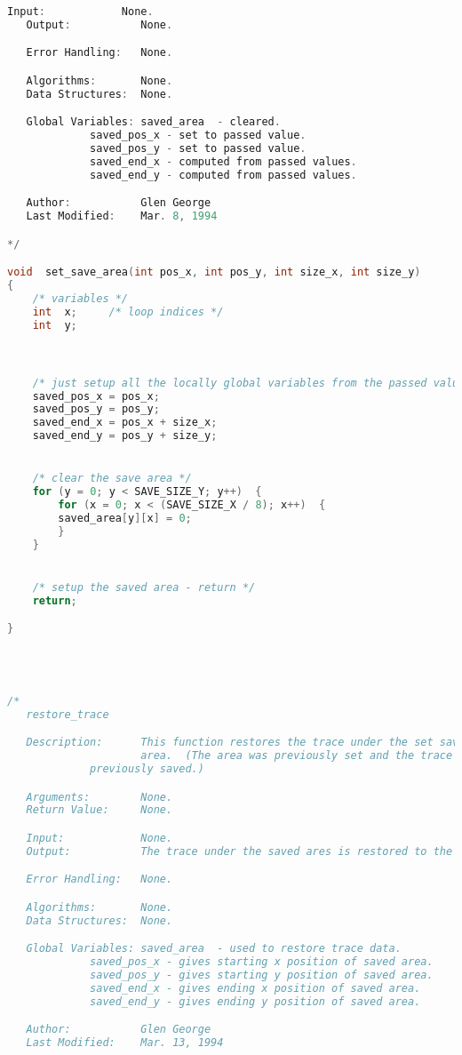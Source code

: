 \begin{lstlisting}[language=C]
   Input:            None.
   Output:           None.

   Error Handling:   None.

   Algorithms:       None.
   Data Structures:  None.

   Global Variables: saved_area  - cleared.
   		     saved_pos_x - set to passed value.
   		     saved_pos_y - set to passed value.
		     saved_end_x - computed from passed values.
		     saved_end_y - computed from passed values.

   Author:           Glen George
   Last Modified:    Mar. 8, 1994

*/

void  set_save_area(int pos_x, int pos_y, int size_x, int size_y)
{
    /* variables */
    int  x;		/* loop indices */
    int  y;



    /* just setup all the locally global variables from the passed values */
    saved_pos_x = pos_x;
    saved_pos_y = pos_y;
    saved_end_x = pos_x + size_x;
    saved_end_y = pos_y + size_y;


    /* clear the save area */
    for (y = 0; y < SAVE_SIZE_Y; y++)  {
        for (x = 0; x < (SAVE_SIZE_X / 8); x++)  {
	    saved_area[y][x] = 0;
        }
    }


    /* setup the saved area - return */
    return;

}




/*
   restore_trace

   Description:      This function restores the trace under the set saved
                     area.  (The area was previously set and the trace was
		     previously saved.)

   Arguments:        None.
   Return Value:     None.

   Input:            None.
   Output:           The trace under the saved ares is restored to the LCD.

   Error Handling:   None.

   Algorithms:       None.
   Data Structures:  None.

   Global Variables: saved_area  - used to restore trace data.
   		     saved_pos_x - gives starting x position of saved area.
   		     saved_pos_y - gives starting y position of saved area.
		     saved_end_x - gives ending x position of saved area.
		     saved_end_y - gives ending y position of saved area.

   Author:           Glen George
   Last Modified:    Mar. 13, 1994


\end{lstlisting}
